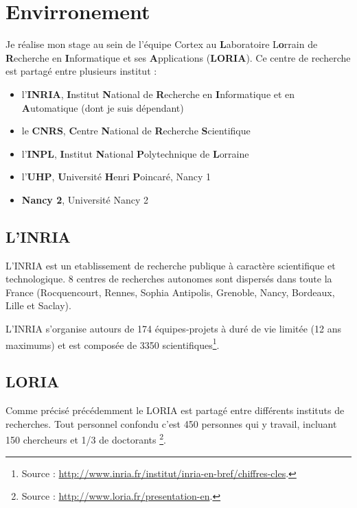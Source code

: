 \chapter{Envirronement} %
\label{cha:Envirronement}

Je réalise mon stage au sein de l'équipe Cortex au \textbf{L}aboratoire L\textbf{o}rrain de
\textbf{R}echerche en \textbf{I}nformatique et ses \textbf{A}pplications (\textbf{LORIA}).
Ce centre de recherche est partagé entre plusieurs institut :
\begin{itemize}
   \item l'\textbf{INRIA}, \textbf{I}nstitut \textbf{N}ational de \textbf{R}echerche en \textbf{I}nformatique
      et en \textbf{A}utomatique (dont je suis dépendant)
   \item le \textbf{CNRS}, \textbf{C}entre \textbf{N}ational de \textbf{R}echerche \textbf{S}cientifique
   \item l'\textbf{INPL}, \textbf{I}nstitut \textbf{N}ational \textbf{P}olytechnique de \textbf{L}orraine
   \item l'\textbf{UHP}, \textbf{U}niversité \textbf{H}enri \textbf{P}oincaré, Nancy 1
   \item \textbf{Nancy 2}, Université Nancy 2
\end{itemize}

\section{L'INRIA} %
\label{sec:L'INRIA}

L'INRIA est un etablissement de recherche publique à caractère scientifique et technologique. 8 centres de
recherches autonomes sont dispersés dans toute la France (Rocquencourt, Rennes, Sophia Antipolis, Grenoble,
Nancy, Bordeaux, Lille et Saclay).

L'INRIA s'organise autours de 174 équipes-projets à duré de vie limitée (12 ans maximums) et est composée
de 3350 scientifiques\footnote{Source : \url{http://www.inria.fr/institut/inria-en-bref/chiffres-cles}.}.


\section{LORIA} %
\label{sec:LORIA}

Comme précisé précédemment le LORIA est partagé entre différents instituts de recherches. Tout personnel confondu
c'est 450 personnes qui y travail, incluant 150 chercheurs et 1/3 de doctorants
\footnote{Source : \url{http://www.loria.fr/presentation-en}.}.

